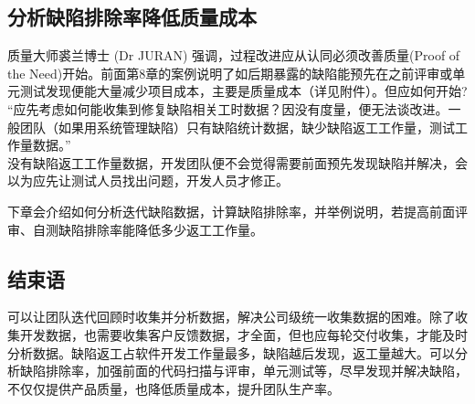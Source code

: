 
\hypertarget{ux5206ux6790ux7f3aux9677ux6392ux9664ux7387ux964dux4f4eux8d28ux91cfux6210ux672c}{%
\subsection{分析缺陷排除率降低质量成本}\label{ux5206ux6790ux7f3aux9677ux6392ux9664ux7387ux964dux4f4eux8d28ux91cfux6210ux672c}}

质量大师裘兰博士 (Dr JURAN) 强调，过程改进应从认同必须改善质量(Proof of the Need)开始。前面第8章的案例说明了如后期暴露的缺陷能预先在之前评审或单元测试发现便能大量减少项目成本，主要是质量成本（详见附件）。但应如何开始? \\





“应先考虑如何能收集到修复缺陷相关工时数据？因没有度量，便无法谈改进。一般团队（如果用系统管理缺陷）只有缺陷统计数据，缺少缺陷返工工作量，测试工作量数据。”\\

没有缺陷返工工作量数据，开发团队便不会觉得需要前面预先发现缺陷并解决，会以为应先让测试人员找出问题，开发人员才修正。

下章会介绍如何分析迭代缺陷数据，计算缺陷排除率，并举例说明，若提高前面评审、自测缺陷排除率能降低多少返工工作量。


\hypertarget{ux7ed3ux675fux8bed}{%
\subsection{结束语}\label{ux7ed3ux675fux8bed}}

可以让团队迭代回顾时收集并分析数据，解决公司级统一收集数据的困难。除了收集开发数据，也需要收集客户反馈数据，才全面，但也应每轮交付收集，才能及时分析数据。缺陷返工占软件开发工作量最多，缺陷越后发现，返工量越大。可以分析缺陷排除率，加强前面的代码扫描与评审，单元测试等，尽早发现并解决缺陷，不仅仅提供产品质量，也降低质量成本，提升团队生产率。

